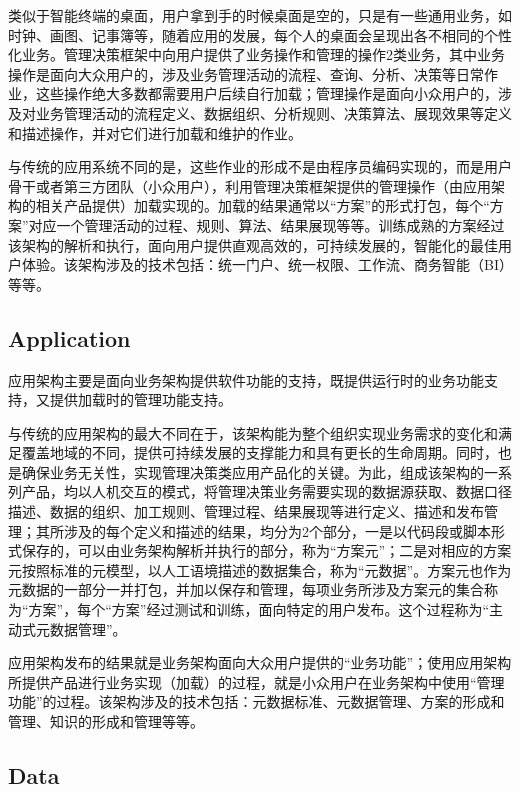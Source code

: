 类似于智能终端的桌面，用户拿到手的时候桌面是空的，只是有一些通用业务，如时钟、画图、记事簿等，随着应用的发展，每个人的桌面会呈现出各不相同的个性化业务。管理决策框架中向用户提供了业务操作和管理的操作2类业务，其中业务操作是面向大众用户的，涉及业务管理活动的流程、查询、分析、决策等日常作业，这些操作绝大多数都需要用户后续自行加载；管理操作是面向小众用户的，涉及对业务管理活动的流程定义、数据组织、分析规则、决策算法、展现效果等定义和描述操作，并对它们进行加载和维护的作业。

与传统的应用系统不同的是，这些作业的形成不是由程序员编码实现的，而是用户骨干或者第三方团队（小众用户），利用管理决策框架提供的管理操作（由应用架构的相关产品提供）加载实现的。加载的结果通常以“方案”的形式打包，每个“方案”对应一个管理活动的过程、规则、算法、结果展现等等。训练成熟的方案经过该架构的解析和执行，面向用户提供直观高效的，可持续发展的，智能化的最佳用户体验。该架构涉及的技术包括：统一门户、统一权限、工作流、商务智能（BI）等等。



\subsection{Application}

应用架构主要是面向业务架构提供软件功能的支持，既提供运行时的业务功能支持，又提供加载时的管理功能支持。

与传统的应用架构的最大不同在于，该架构能为整个组织实现业务需求的变化和满足覆盖地域的不同，提供可持续发展的支撑能力和具有更长的生命周期。同时，也是确保业务无关性，实现管理决策类应用产品化的关键。为此，组成该架构的一系列产品，均以人机交互的模式，将管理决策业务需要实现的数据源获取、数据口径描述、数据的组织、加工规则、管理过程、结果展现等进行定义、描述和发布管理；其所涉及的每个定义和描述的结果，均分为2个部分，一是以代码段或脚本形式保存的，可以由业务架构解析并执行的部分，称为“方案元”；二是对相应的方案元按照标准的元模型，以人工语境描述的数据集合，称为“元数据”。方案元也作为元数据的一部分一并打包，并加以保存和管理，每项业务所涉及方案元的集合称为“方案”，每个“方案”经过测试和训练，面向特定的用户发布。这个过程称为“主动式元数据管理”。

应用架构发布的结果就是业务架构面向大众用户提供的“业务功能”；使用应用架构所提供产品进行业务实现（加载）的过程，就是小众用户在业务架构中使用“管理功能”的过程。该架构涉及的技术包括：元数据标准、元数据管理、方案的形成和管理、知识的形成和管理等等。


\subsection{Data}

